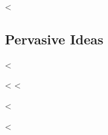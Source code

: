 <%
  \subsection*{Pervasive Ideas}
  \begin{pervasiveitems}
  <%
    \item
      <%
  <%
  \end{pervasiveitems}
<%

<%
